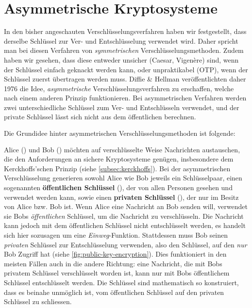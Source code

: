 \chapter{Asymmetrische Kryptosysteme}\label{chap:asymmetrische-kryptosysteme}

In den bisher angeschauten Verschlüsselungsverfahren haben wir festgestellt, dass derselbe Schlüssel zur Ver- und Entschlüsselung verwendet wird. Daher spricht man bei diesen Verfahren von \emph{symmetrischen} Verschlüsselungsmethoden. Zudem haben wir gesehen, dass diese entweder unsicher (Caesar, Vigenère) sind, wenn der Schlüssel einfach geknackt werden kann, oder unpraktikabel (\gls{OTP}), wenn der Schlüssel zuerst übertragen werden muss. Diffie \& Hellman veröffentlichten daher 1976 die Idee, \emph{asymmetrische} Verschlüsselungsverfahren zu erschaffen, welche nach einem anderen Prinzip funktionieren. Bei asymmetrischen Verfahren werden zwei unterschiedliche Schlüssel zum Ver- und Entschlüsseln verwendet, und der private Schlüssel lässt sich nicht aus dem öffentlichen berechnen.

Die Grundidee hinter asymmetrischen Verschlüsselungsmethoden ist folgende:

Alice () und Bob () möchten auf verschlüsselte Weise Nachrichten austauschen, die den Anforderungen an sichere Kryptosysteme genügen, insbesondere dem Kerckhoffs'schen Prinzip (siehe \cref{subsec:kerckhoffs}). Bei der asymmetrischen Verschlüsselung generieren sowohl Alice wie Bob jeweils ein Schlüsselpaar, einen sogenannten \textbf{öffentlichen Schlüssel} (), der von allen Personen gesehen und verwendet werden kann, sowie einen \textbf{privaten Schlüssel} (), der nur im Besitz von Alice bzw. Bob ist. Wenn Alice eine Nachricht an Bob senden will, verwendet sie Bobs \emph{öffentlichen} Schlüssel, um die Nachricht zu verschlüsseln. Die Nachricht kann jedoch mit dem öffentlichen Schlüssel nicht entschlüsselt werden, es handelt sich hier sozusagen um eine \emph{Einweg}-Funktion. Stattdessen muss Bob seinen \emph{privaten} Schlüssel zur Entschlüsselung verwenden, also den Schlüssel, auf den \emph{nur} Bob Zugriff hat (siehe \cref{fig:public-key-encryption}). Dies funktioniert in den meisten Fällen auch in die andere Richtung: eine Nachricht, die mit Bobs privatem Schlüssel verschlüsselt worden ist, kann nur mit Bobs öffentlichem Schlüssel entschlüsselt werden. Die Schlüssel sind mathematisch so konstruiert, dass es beinahe unmöglich ist, vom öffentlichen Schlüssel auf den privaten Schlüssel zu schliessen.


